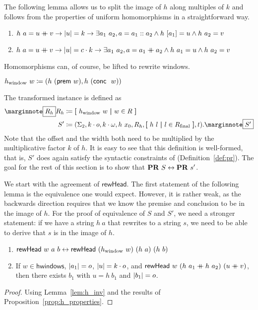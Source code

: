 The following lemma allows us to split the image of $h$ along multiples of $k$ and follows from the properties of uniform homomorphisms in a straightforward way.
\begin{lemma}[Inversion of $h$]\label{lem:h_inv}\leavevmode
  \begin{enumerate}
    \item $h~a = u \mathbin{+\mkern-10mu+} v \rightarrow |u| = k \rightarrow \exists a_1~a_2, a = a_1 :: a_2 \land h~[a_1] = u \land h~a_2 = v$
    \item $h~a = u \mathbin{+\mkern-10mu+} v \rightarrow |u| = c \cdot k \rightarrow \exists a_1~a_2, a = a_1 \mathbin{+\mkern-10mu+} a_2 \land h~a_1 = u \land h~a_2 = v$ 
  \end{enumerate}
\end{lemma}

Homomorphisms can, of course, be lifted to rewrite windows. 
\begin{definition}
  $h_\text{window}~w\coloneqq (h~(\textsf{prem}~w), h~(\textsf{conc}~~w)) $
\end{definition}
The transformed \PR{} instance is defined as
\begin{align*}
  \mnote{$R_h$}
  R_h &\defeq \withl h_\text{window}~w \withm w \in R \withr \\
  S' &\defeq (\Sigma_2, k \cdot o, k \cdot \omega, h~x_0, R_h, \withl h~l \withm l \in \Rfinal \withr, t).
  \mnote{$S'$}
\end{align*}
Note that the offset and the width both need to be multiplied by the multiplicative factor $k$ of $h$.
It is easy to see that this definition is well-formed, that is, $S'$ does again satisfy the syntactic constraints of \PR{} (Definition~\ref{def:pr}).
The goal for the rest of this section is to show that $\textbf{PR}{}~S \leftrightarrow \textbf{PR}{}~s'$. 

We start with the agreement of $\textsf{rewHead}$.
The first statement of the following lemma is the equivalence one would expect. However, it is rather weak, as the backwards direction requires that we know the premise and conclusion to be in the image of $h$.
For the proof of equivalence of $S$ and $S'$, we need a stronger statement: if we have a string $h~a$ that rewrites to a string $s$, we need to be able to derive that $s$ is in the image of $h$.

\begin{lemma}\label{lem:rewHead_agree}\leavevmode
  \begin{enumerate}
    \item $\textsf{rewHead}~w~a~b \leftrightarrow \textsf{rewHead}~(h_{\text{window}}~w)~(h~a)~(h~b)$
    \item If $w \in \textsf{hwindows}$, $|a_1| = o$, $|u| = k \cdot o$, and $\textsf{rewHead}~w~(h~a_1 \mathbin{+\mkern-10mu+} h~a_2)~(u \mathbin{+\mkern-10mu+} v)$, then there exists $b_1$ with $u = h~b_1$ and $|b_1| = o$.
  \end{enumerate}
\end{lemma}
\begin{proof}
  Using Lemma~\ref{lem:h_inv} and the results of Proposition~\ref{prop:h_properties}.
\end{proof}

